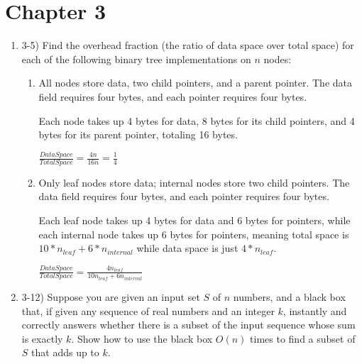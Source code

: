 \documentclass{article}
\begin{document}
\section{Chapter 3}
\begin{enumerate}
    \item 3-5) Find the overhead fraction (the ratio of data space over total space) for each of the following binary tree implementations on $n$ nodes:
    \begin{enumerate}
        \item All nodes store data, two child pointers, and a parent pointer. The data field requires four bytes, and each pointer requires four bytes. 
        
        Each node takes up 4 bytes for data, 8 bytes for its child pointers, and 4 bytes for its parent pointer, totaling 16 bytes.
        
        $\frac{DataSpace}{TotalSpace}=\frac{4n}{16n}=\boxed{\frac{1}{4}}$
        
        \item Only leaf nodes store data; internal nodes store two child pointers. The data field requires four bytes, and each pointer requires four bytes.

        Each leaf node takes up 4 bytes for data and 6 bytes for pointers, while each internal node takes up 6 bytes for pointers, meaning total space is $10*n_{leaf} + 6*n_{internal}$ while data space is just $4*n_{leaf}$.

        $\frac{DataSpace}{TotalSpace}=\frac{4n_{leaf}}{10n_{leaf}+6n_{interval}}$

    \end{enumerate}
    \item 3-12) Suppose you are given an input set $S$ of $n$ numbers, and a black box that, if given any sequence of real numbers and an integer $k$, instantly and correctly answers whether there is a subset of the input sequence whose sum is exactly $k$. Show how to use the black box $O(n)$ times to find a subset of $S$ that adds up to $k$.

\end{enumerate}
\end{document}
